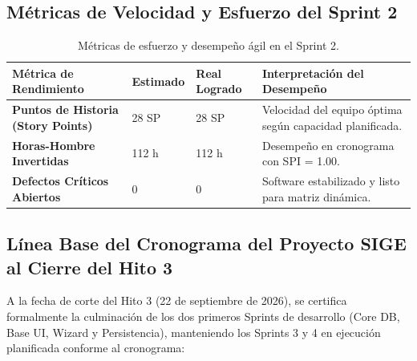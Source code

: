 \documentclass[12pt,a4paper]{article}
\begin{document}
\subsection{Métricas de Velocidad y Esfuerzo del Sprint 2}
\begin{table}[H]
\centering
\small
\renewcommand{\arraystretch}{1.2}
\begin{tabularx}{\textwidth}{|>{\hsize=0.9\hsize\raggedright\arraybackslash\bfseries\footnotesize}X|>{\hsize=0.6\hsize\centering\arraybackslash\footnotesize}X|>{\hsize=0.6\hsize\centering\arraybackslash\footnotesize}X|>{\hsize=1.9\hsize\raggedright\arraybackslash\footnotesize}X|}
\hline
\rowcolor{tableheader}
\textbf{Métrica de Rendimiento} & \textbf{Estimado} & \textbf{Real Logrado} & \textbf{Interpretación del Desempeño} \\
\hline
Puntos de Historia (Story Points) & 28 SP & 28 SP & Velocidad del equipo óptima según capacidad planificada. \\
\hline
Horas-Hombre Invertidas & 112 h & 112 h & Desempeño en cronograma con SPI = 1.00. \\
\hline
Defectos Críticos Abiertos & 0 & 0 & Software estabilizado y listo para matriz dinámica. \\
\hline
\end{tabularx}
\caption{Métricas de esfuerzo y desempeño ágil en el Sprint 2.}
\end{table}

\subsection{Línea Base del Cronograma del Proyecto SIGE al Cierre del Hito 3}
A la fecha de corte del Hito 3 (22 de septiembre de 2026), se certifica formalmente la culminación de los dos primeros Sprints de desarrollo (Core DB, Base UI, Wizard y Persistencia), manteniendo los Sprints 3 y 4 en ejecución planificada conforme al cronograma:
\end{document}
